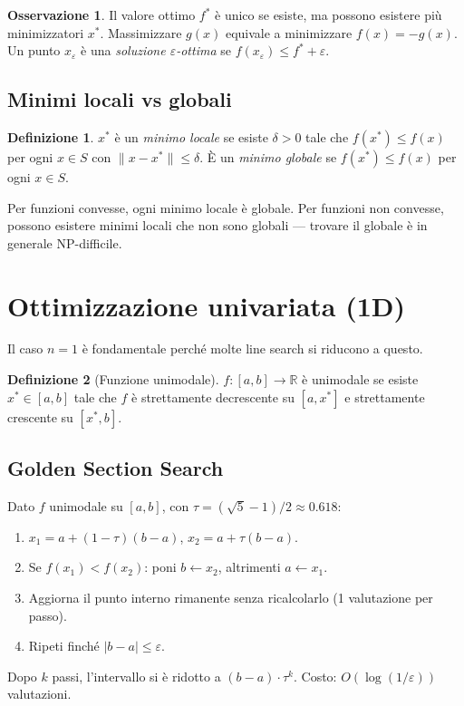 \documentclass[11pt, a4paper, twoside]{book}
\theoremstyle{definition}
\newtheorem{defn}{Definizione}[chapter]
\newtheorem{remark}{Osservazione}[chapter]
\theoremstyle{plain}
\theoremstyle{remark}
\newcommand{\R}{\mathbb{R}}
\newcommand{\eps}{\varepsilon}
\begin{document}
\begin{remark}
Il valore ottimo $f^*$ è unico se esiste, ma possono esistere più minimizzatori $x^*$. Massimizzare $g(x)$ equivale a minimizzare $f(x) = -g(x)$. Un punto $x_\eps$ è una \emph{soluzione $\eps$-ottima} se $f(x_\eps) \leq f^* + \eps$.
\end{remark}

\subsection{Minimi locali vs globali}

\begin{defn}
$x^*$ è un \emph{minimo locale} se esiste $\delta > 0$ tale che $f(x^*) \leq f(x)$ per ogni $x \in S$ con $\|x - x^*\| \leq \delta$. È un \emph{minimo globale} se $f(x^*) \leq f(x)$ per ogni $x \in S$.
\end{defn}

Per funzioni convesse, ogni minimo locale è globale. Per funzioni non convesse, possono esistere minimi locali che non sono globali — trovare il globale è in generale NP-difficile.

\section{Ottimizzazione univariata (1D)}
\label{sec:univ}

Il caso $n=1$ è fondamentale perché molte line search si riducono a questo.

\begin{defn}[Funzione unimodale]
$f: [a,b] \to \R$ è unimodale se esiste $x^* \in [a,b]$ tale che $f$ è strettamente decrescente su $[a, x^*]$ e strettamente crescente su $[x^*, b]$.
\end{defn}

\subsection{Golden Section Search}

\begin{algobox}
Dato $f$ unimodale su $[a, b]$, con $\tau = (\sqrt{5}-1)/2 \approx 0.618$:
\begin{enumerate}
  \item $x_1 = a + (1-\tau)(b-a)$, $x_2 = a + \tau(b-a)$.
  \item Se $f(x_1) < f(x_2)$: poni $b \leftarrow x_2$, altrimenti $a \leftarrow x_1$.
  \item Aggiorna il punto interno rimanente senza ricalcolarlo (1 valutazione per passo).
  \item Ripeti finché $|b-a| \leq \eps$.
\end{enumerate}
Dopo $k$ passi, l'intervallo si è ridotto a $(b-a) \cdot \tau^k$. Costo: $O(\log(1/\eps))$ valutazioni.
\end{algobox}
\end{document}
